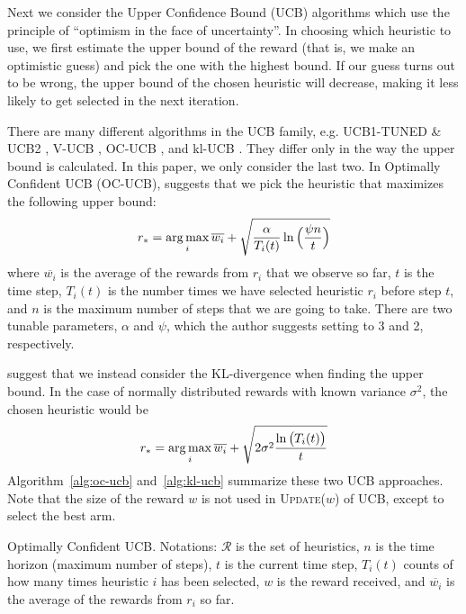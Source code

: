\documentclass[fleqn,10pt,lineno]{wlpeerj} %
\newcommand{\R}{\mathcal{R}}
\newcommand*{\argmax}{\operatornamewithlimits{arg\,max}\limits}
\newcommand{\Select}{\textsc{Select}}
\newcommand{\Update}{\textsc{Update}}
\begin{document}
 Next we consider the Upper Confidence Bound (UCB) algorithms which use the
principle of ``optimism in the face of uncertainty''. In choosing which
heuristic to use, we first estimate the upper bound of the reward (that is, we
make an optimistic guess) and pick the one with the highest bound. If our guess
turns out to be wrong, the upper bound of the chosen heuristic will decrease,
making it less likely to get selected in the next iteration.

There are many different algorithms in the UCB family, e.g. UCB1-TUNED \& UCB2
\citep{auer02finite}, V-UCB \citep{audibert09}, OC-UCB \citep{lattimore15}, and
kl-UCB \citep{cappe13}. They differ only in the way the upper bound is
calculated. In this paper, we only consider the last two. In Optimally
Confident UCB (OC-UCB), \cite{lattimore15} suggests that we pick the heuristic
that maximizes the following upper bound:
    \begin{align}
		r_* = \argmax_{i} \overline{w_i} +
			  \sqrt{\dfrac{\alpha}{T_i(t)} \ln\Big(\dfrac{\psi n}{t}\Big)}
    \end{align}
where $\overline{w_i}$ is the average of the rewards from $r_i$ that we observe
so far, $t$ is the time step, $T_i(t)$ is the number times we have selected
heuristic $r_i$ before step $t$, and $n$ is the maximum number of steps that we
are going to take. There are two tunable parameters, $\alpha$ and $\psi$, which
the author suggests setting to 3 and 2, respectively.

\cite{cappe13} suggest that we instead consider the KL-divergence when finding
the upper bound. In the case of normally distributed rewards with known variance
$\sigma^2$, the chosen heuristic would be
    \begin{align}
		r_* = \argmax_{i} \overline{w_i} +
			  \sqrt{ 2 \sigma^2 \dfrac{\ln\big(T_i(t)\big)}{t} }
    \end{align}
Algorithm~\ref{alg:oc-ucb} and~\ref{alg:kl-ucb} summarize these two UCB
approaches. Note that the size of the reward $w$ is not used in
\Update($w$) of UCB, except
to select the best arm.

\begin{algorithm}[htbp]
	\BlankLine
	\Fn{\Select()}{
		$r_* \leftarrow \argmax_{i} \overline{w_i} +
			  \sqrt{\dfrac{3}{T_i(t)} \ln\Big(\dfrac{2 n}{t}\Big)}$ \;
	}
	\BlankLine
	\Fn{\Update($w$)}{
		$t \leftarrow t + 1$ \;
		$T_*(t) \leftarrow T_*(t - 1) + 1$ \;
	}
	\caption{Optimally Confident UCB. Notations: $\R$ is the set of heuristics,
			 $n$ is the time horizon (maximum number of steps), $t$ is the
			 current time step, $T_i(t)$ counts of how many times heuristic $i$
			 has been selected, $w$ is the reward received, and
			 $\overline{w_i}$ is the average of the rewards from $r_i$ so
			 far.}
	\label{alg:oc-ucb}
\end{algorithm}
\end{document}
